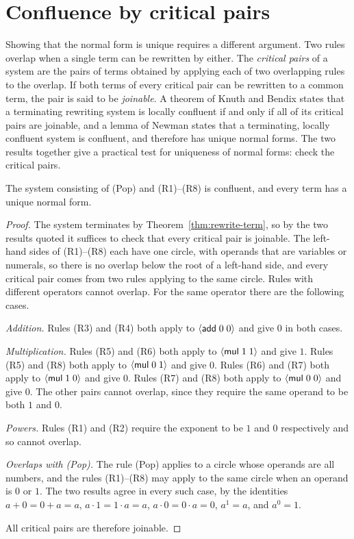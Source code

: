 \section{Confluence by critical pairs}

Showing that the normal form is unique requires a different argument. Two rules overlap when a single term can be rewritten by either. The \emph{critical pairs} of a system are the pairs of terms obtained by applying each of two overlapping rules to the overlap. If both terms of every critical pair can be rewritten to a common term, the pair is said to be \emph{joinable}. A theorem of Knuth and Bendix states that a terminating rewriting system is locally confluent if and only if all of its critical pairs are joinable, and a lemma of Newman states that a terminating, locally confluent system is confluent, and therefore has unique normal forms. The two results together give a practical test for uniqueness of normal forms: check the critical pairs.

\begin{theorem}\label{thm:rewrite-conf}
The system consisting of (Pop) and (R1)--(R8) is confluent, and every term has a unique normal form.
\end{theorem}
\begin{proof}
The system terminates by Theorem~\ref{thm:rewrite-term}, so by the two results quoted it suffices to check that every critical pair is joinable. The left-hand sides of (R1)--(R8) each have one circle, with operands that are variables or numerals, so there is no overlap below the root of a left-hand side, and every critical pair comes from two rules applying to the same circle. Rules with different operators cannot overlap. For the same operator there are the following cases.

\emph{Addition.} Rules (R3) and (R4) both apply to $\langle \mathsf{add}\; 0\; 0\rangle$ and give $0$ in both cases.

\emph{Multiplication.} Rules (R5) and (R6) both apply to $\langle \mathsf{mul}\; 1\; 1\rangle$ and give $1$. Rules (R5) and (R8) both apply to $\langle \mathsf{mul}\; 0\; 1\rangle$ and give $0$. Rules (R6) and (R7) both apply to $\langle \mathsf{mul}\; 1\; 0\rangle$ and give $0$. Rules (R7) and (R8) both apply to $\langle \mathsf{mul}\; 0\; 0\rangle$ and give $0$. The other pairs cannot overlap, since they require the same operand to be both $1$ and $0$.

\emph{Powers.} Rules (R1) and (R2) require the exponent to be $1$ and $0$ respectively and so cannot overlap.

\emph{Overlaps with (Pop).} The rule (Pop) applies to a circle whose operands are all numbers, and the rules (R1)--(R8) may apply to the same circle when an operand is $0$ or $1$. The two results agree in every such case, by the identities $a+0=0+a=a$, $a\cdot1=1\cdot a=a$, $a\cdot0=0\cdot a=0$, $a^{1}=a$, and $a^{0}=1$.

All critical pairs are therefore joinable.
\end{proof}

